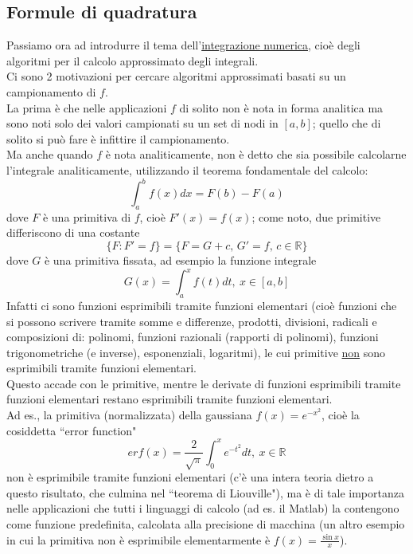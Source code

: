 \subsection{Formule di quadratura}
Passiamo ora ad introdurre il tema dell'\uline{integrazione numerica}, cioè degli algoritmi per il calcolo approssimato degli integrali.\\Ci sono 2 motivazioni per cercare algoritmi approssimati basati su un campionamento di $f$.\\La prima è che nelle applicazioni $f$ di solito non è nota in forma analitica ma sono noti solo dei valori campionati su un set di nodi in $[a,b]$; quello che di solito si può fare è infittire il campionamento.\\
Ma anche quando $f$ è nota analiticamente, non è detto che sia possibile calcolarne l'integrale analiticamente, utilizzando il teorema fondamentale del calcolo:
\begin{equation*}
    \int_a^b f(x)dx=F(b)-F(a)
\end{equation*}
dove $F$ è una primitiva di $f$, cioè $F'(x)=f(x)$; come noto, due primitive differiscono di una costante
\begin{equation*}
    \{F:F'=f\}=\{F=G+c,\,G'=f,\,c\in\mathbb{R}\}
\end{equation*}
dove $G$ è una primitiva fissata, ad esempio la funzione integrale
\begin{equation*}
    G(x) = \int_{a}^{x} f(t) dt, \ x \in [a,b]
\end{equation*}
Infatti ci sono funzioni esprimibili tramite funzioni elementari (cioè funzioni che si possono scrivere tramite somme e differenze, prodotti, divisioni, radicali e composizioni di: polinomi, funzioni razionali (rapporti di polinomi), funzioni trigonometriche (e inverse), esponenziali, logaritmi), le cui primitive \uline{non} sono esprimibili tramite funzioni elementari. \\
Questo accade con le primitive, mentre le derivate di funzioni esprimibili tramite funzioni elementari restano esprimibili tramite funzioni elementari. \\
Ad es., la primitiva (normalizzata) della gaussiana $f(x) = e^{-x^2}$, cioè la cosiddetta ``error function"
\begin{equation*}
    erf(x) = \frac{2}{\sqrt{\pi}} \int_0^x e^{-t^2} dt, \ x \in \mathbb{R}
\end{equation*}
non è esprimibile tramite funzioni elementari (c'è una intera teoria dietro a questo risultato, che culmina nel ``teorema di Liouville"), ma è di tale importanza nelle applicazioni che tutti i linguaggi di calcolo (ad es. il Matlab) la contengono come funzione predefinita, calcolata alla precisione di macchina (un altro esempio in cui la primitiva non è esprimibile elementarmente è $f(x) = \frac{\sin{x}}{x}$).\\
